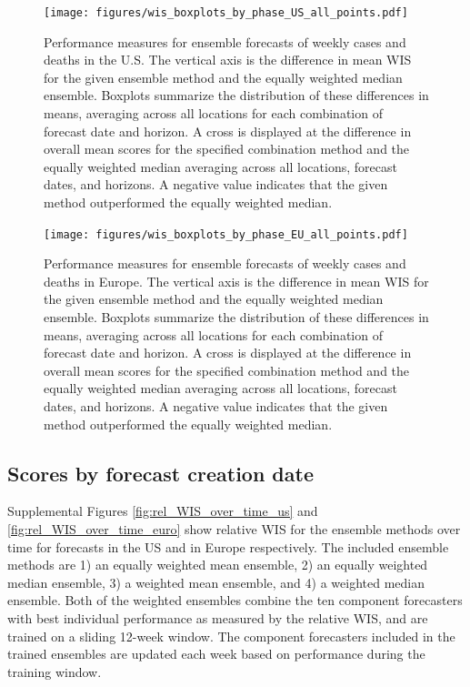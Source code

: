 \documentclass{article}
\begin{document}
\begin{figure}[H]
\texttt{[image: figures/wis\_boxplots\_by\_phase\_US\_all\_points.pdf]}
\caption{Performance measures for ensemble forecasts of weekly cases and deaths in the U.S. The vertical axis is the difference in mean WIS for the given ensemble method and the equally weighted median ensemble.
Boxplots summarize the distribution of these differences in means, averaging across all locations for each combination of forecast date and horizon.
A cross is displayed at the difference in overall mean scores for the specified combination method and the equally weighted median averaging across all locations, forecast dates, and horizons.
A negative value indicates that the given method outperformed the equally weighted median.
}
\label{fig:wis_boxplots_by_phase_all_points_us}
\end{figure}

\begin{figure}[H]
\texttt{[image: figures/wis\_boxplots\_by\_phase\_EU\_all\_points.pdf]}
\caption{Performance measures for ensemble forecasts of weekly cases and deaths in Europe. The vertical axis is the difference in mean WIS for the given ensemble method and the equally weighted median ensemble.
Boxplots summarize the distribution of these differences in means, averaging across all locations for each combination of forecast date and horizon.
A cross is displayed at the difference in overall mean scores for the specified combination method and the equally weighted median averaging across all locations, forecast dates, and horizons.
A negative value indicates that the given method outperformed the equally weighted median.
}
\label{fig:wis_boxplots_by_phase_all_points_eu}
\end{figure}

\newpage

\subsection{Scores by forecast creation date}

Supplemental Figures \ref{fig:rel_WIS_over_time_us} and \ref{fig:rel_WIS_over_time_euro} show relative WIS for the ensemble methods over time for forecasts in the US and in Europe respectively.
The included ensemble methods are 1) an equally weighted mean ensemble, 2) an equally weighted median ensemble, 3) a weighted mean ensemble, and 4) a weighted median ensemble.
Both of the weighted ensembles combine the ten component forecasters with best individual performance as measured by the relative WIS, and are trained on a sliding 12-week window.
The component forecasters included in the trained ensembles are updated each week based on performance during the training window.
  
\end{document}
